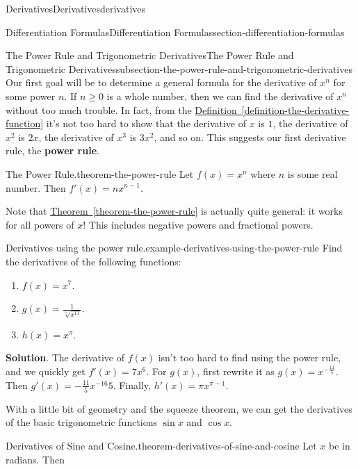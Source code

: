 \documentclass[oneside,10pt,]{book}
\newcommand{\terminology}[1]{\textbf{#1}}
\numberwithin{equation}{section}
\begin{document}
\begin{chapterptx}{Derivatives}{}{Derivatives}{}{}{derivatives}
\begin{sectionptx}{Differentiation Formulas}{}{Differentiation Formulas}{}{}{section-differentiation-formulas}
\begin{subsectionptx}{The Power Rule and Trigonometric Derivatives}{}{The Power Rule and Trigonometric Derivatives}{}{}{subsection-the-power-rule-and-trigonometric-derivatives}
Our first goal will be to determine a general formula for the derivative of \(x^{n}\) for some power \(n\). If \(n\geq0\) is a whole number, then we can find the derivative of \(x^{n}\) without too much trouble. In fact, from the \hyperref[definition-the-derivative-function]{Definition~\ref{definition-the-derivative-function}} it's not too hard to show that the derivative of \(x\) is \(1\), the derivative of \(x^{2}\) is \(2x\), the derivative of \(x^{3}\) is \(3x^{2}\), and so on. This suggests our first derivative rule, the \terminology{power rule}.%
\begin{theorem}{The Power Rule.}{}{theorem-the-power-rule}%
\hypertarget{p-125}{}%
Let \(f(x) = x^{n}\) where \(n\) is some real number. Then \(f'(x) = nx^{n-1}\).%
\end{theorem}
\hypertarget{p-126}{}%
Note that \hyperref[theorem-the-power-rule]{Theorem~\ref{theorem-the-power-rule}} is actually quite general: it works for all powers of \(x\)! This includes negative powers and fractional powers.%
\begin{example}{Derivatives using the power rule.}{example-derivatives-using-the-power-rule}%
\hypertarget{p-127}{}%
Find the derivatives of the following functions:\leavevmode%
\begin{enumerate}
\item\hypertarget{li-5}{}\(f(x) = x^{7}\).%
\item\hypertarget{li-6}{}\(g(x) = \frac{1}{\sqrt[5]{x^{11}}}\).%
\item\hypertarget{li-7}{}\(h(x) = x^{\pi}\).%
\end{enumerate}
%
\par\smallskip%
\noindent\textbf{Solution}.\hypertarget{solution-26}{}\quad%
\hypertarget{p-128}{}%
The derivative of \(f(x)\) isn't too hard to find using the power rule, and we quickly get \(f'(x) = 7x^{6}\). For \(g(x)\), first rewrite it as \(g(x) = x^{-\frac{11}{5}}\). Then \(g'(x) = -\frac{11}{5}x^{-16}{5}\). Finally, \(h'(x) = \pi x^{\pi-1}\).%
\end{example}
\hypertarget{p-129}{}%
With a little bit of geometry and the squeeze theorem, we can get the derivatives of the basic trigonometric functions \(\sin x\) and \(\cos x\).%
\begin{theorem}{Derivatives of Sine and Cosine.}{}{theorem-derivatives-of-sine-and-cosine}%
\hypertarget{p-130}{}%
Let \(x\) be in radians. Then%
\begin{equation*}

\end{equation*}
\end{theorem}
\end{subsectionptx}
\end{sectionptx}
\end{chapterptx}
\end{document}

